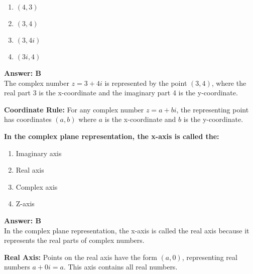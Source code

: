 \documentclass[12pt,a4paper]{article}
\begin{document}
\begin{partbox}[Options]
\begin{enumerate}[label=\Alph*.]
    \item \( (4, 3) \)
    \item \( (3, 4) \)
    \item \( (3, 4i) \)
    \item \( (3i, 4) \)
\end{enumerate}
\end{partbox}

\begin{answerstyle}
\textbf{Answer: B} \\
The complex number \( z = 3 + 4i \) is represented by the point \( (3, 4) \), where the real part 3 is the x-coordinate and the imaginary part 4 is the y-coordinate.
\end{answerstyle}

\begin{conceptbox}
\textbf{Coordinate Rule:} For any complex number \( z = a + bi \), the representing point has coordinates \( (a, b) \) where \( a \) is the x-coordinate and \( b \) is the y-coordinate.
\end{conceptbox}

\newpage
\begin{questiontitle}[MCQ 75]
\textbf{In the complex plane representation, the x-axis is called the:}
\end{questiontitle}

\begin{partbox}[Options]
\begin{enumerate}[label=\Alph*.]
    \item Imaginary axis
    \item Real axis
    \item Complex axis
    \item Z-axis
\end{enumerate}
\end{partbox}

\begin{answerstyle}
\textbf{Answer: B} \\
In the complex plane representation, the x-axis is called the real axis because it represents the real parts of complex numbers.
\end{answerstyle}

\begin{conceptbox}
\textbf{Real Axis:} Points on the real axis have the form \( (a, 0) \), representing real numbers \( a + 0i = a \). This axis contains all real numbers.
\end{conceptbox}
\end{document}
